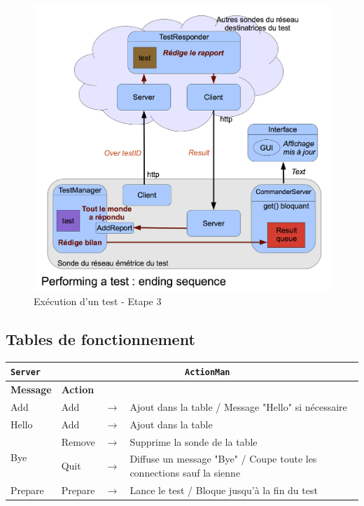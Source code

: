 \documentclass[a4paper,11pt]{article}
\newcommand{\cd}[1]{\texttt{#1}}
\begin{document}
\begin{figure}[!ht]
\centering\includegraphics[width=\linewidth]{img/graphTest3.png}
\caption{Exécution d'un test - Etape 3}
\end{figure}

\FloatBarrier

\subsection{Tables de fonctionnement}

\begin{center}
\begin{tabular}{|l|l|c|l|}
\hline
\cd{Server} & \multicolumn{3}{|c|}{\cd{ActionMan}} \\
\hline
\textbf{Message} & \textbf{Action} & & \\
\hline
Add & Add & $\longrightarrow$ & Ajout dans la table / Message "Hello" si nécessaire\\
\hline
Hello & Add & $\longrightarrow$ & Ajout dans la table\\
\hline
\multirow{2}{*}{Bye} & Remove & $\longrightarrow$ & Supprime la sonde de la table\\
\cline{2-4}
 & Quit & $\longrightarrow$ & Diffuse un message "Bye" / Coupe toute les connections sauf la sienne\\
\hline
Prepare & Prepare & $\longrightarrow$ & Lance le test / Bloque jusqu'à la fin du test \\
\hline
\end{tabular}
\end{center}
\end{document}
